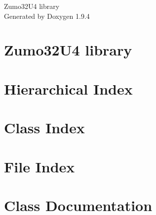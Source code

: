 \documentclass[twoside]{book}
\newcommand{\+}{\discretionary{\mbox{\scriptsize$\hookleftarrow$}}{}{}}
\newcommand{\clearemptydoublepage}{%
    \newpage{\pagestyle{empty}\cleardoublepage}%
  }
\begin{document}
  \raggedbottom
    \hypersetup{pageanchor=false,
                bookmarksnumbered=true,
                pdfencoding=unicode
               }
  \begin{titlepage}
  \vspace*{7cm}
  \begin{center}%
  {\Large Zumo32\+U4 library}\\
  \vspace*{1cm}
  {\large Generated by Doxygen 1.9.4}\\
  \end{center}
  \end{titlepage}
  \clearemptydoublepage
  \tableofcontents
  \clearemptydoublepage
  \hypersetup{pageanchor=true}
\chapter{Zumo32\+U4 library}
\label{index}\hypertarget{index}{}
\chapter{Hierarchical Index}

\chapter{Class Index}

\chapter{File Index}

\chapter{Class Documentation}























\end{document}
